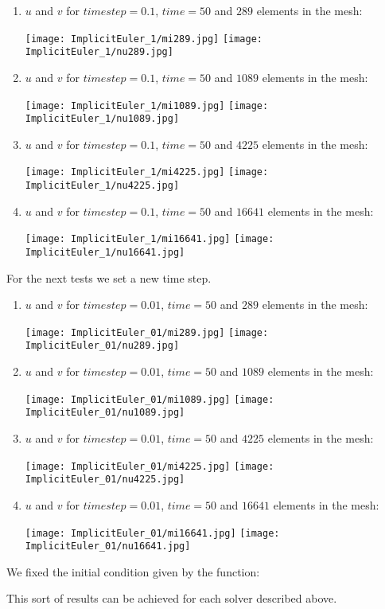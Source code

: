 \documentclass[a4paper]{article}
\begin{document}
\begin{enumerate}

\item $u$ and $v$ for $timestep = 0.1$, $time = 50$ and $289$ elements in the mesh:

\texttt{[image: ImplicitEuler\_1/mi289.jpg]}
\texttt{[image: ImplicitEuler\_1/nu289.jpg]}

\item $u$ and $v$ for $timestep = 0.1$, $time = 50$ and $1089$ elements in the mesh:

\texttt{[image: ImplicitEuler\_1/mi1089.jpg]}
\texttt{[image: ImplicitEuler\_1/nu1089.jpg]}

\item $u$ and $v$ for $timestep = 0.1$, $time = 50$ and $4225$ elements in the mesh:

\texttt{[image: ImplicitEuler\_1/mi4225.jpg]}
\texttt{[image: ImplicitEuler\_1/nu4225.jpg]}

\item $u$ and $v$ for $timestep = 0.1$, $time = 50$ and $16641$ elements in the mesh:

\texttt{[image: ImplicitEuler\_1/mi16641.jpg]}
\texttt{[image: ImplicitEuler\_1/nu16641.jpg]}

\end{enumerate}

For the next tests we set a new time step.

\begin{enumerate}

\item $u$ and $v$ for $timestep = 0.01$, $time = 50$ and $289$ elements in the mesh:

\texttt{[image: ImplicitEuler\_01/mi289.jpg]}
\texttt{[image: ImplicitEuler\_01/nu289.jpg]}

\item $u$ and $v$ for $timestep = 0.01$, $time = 50$ and $1089$ elements in the mesh:

\texttt{[image: ImplicitEuler\_01/mi1089.jpg]}
\texttt{[image: ImplicitEuler\_01/nu1089.jpg]}

\item $u$ and $v$ for $timestep = 0.01$, $time = 50$ and $4225$ elements in the mesh:

\texttt{[image: ImplicitEuler\_01/mi4225.jpg]}
\texttt{[image: ImplicitEuler\_01/nu4225.jpg]}

\item $u$ and $v$ for $timestep = 0.01$, $time = 50$ and $16641$ elements in the mesh:

\texttt{[image: ImplicitEuler\_01/mi16641.jpg]}
\texttt{[image: ImplicitEuler\_01/nu16641.jpg]}

\end{enumerate}

We fixed the initial condition given by the function:



This sort of results can be achieved for each solver described above.
\end{document}
